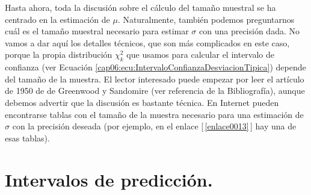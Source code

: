 Hasta ahora, toda la discusión sobre el cálculo del tamaño muestral se ha centrado en la estimación
de $\mu$. Naturalmente, también podemos preguntarnos cuál es el tamaño muestral necesario para
estimar $\sigma$ con una precisión dada. No vamos a dar aquí los detalles técnicos, que son más
complicados en este caso, porque la propia distribución $\chi^2_k$ que usamos para calcular el
intervalo de confianza  (ver Ecuación \ref{cap06:ecu:IntervaloConfianzaDesviacionTipica}) depende
del tamaño de la muestra. El lector interesado puede empezar por leer el artículo de 1950 de de
Greenwood y Sandomire (ver referencia \cite{greenwood1950sample} de la Bibliografía), aunque debemos advertir que la discusión es bastante técnica. En Internet pueden encontrarse tablas con el tamaño de la muestra necesario para una estimación de $\sigma$ con la precisión deseada (por ejemplo, en el enlace  [\,\ref{enlace0013}\,]\label{enlace0013a} hay una de esas tablas).


\section{Intervalos de predicción.}
\label{cap06:sec:IntervalosPrediccion}
\\

